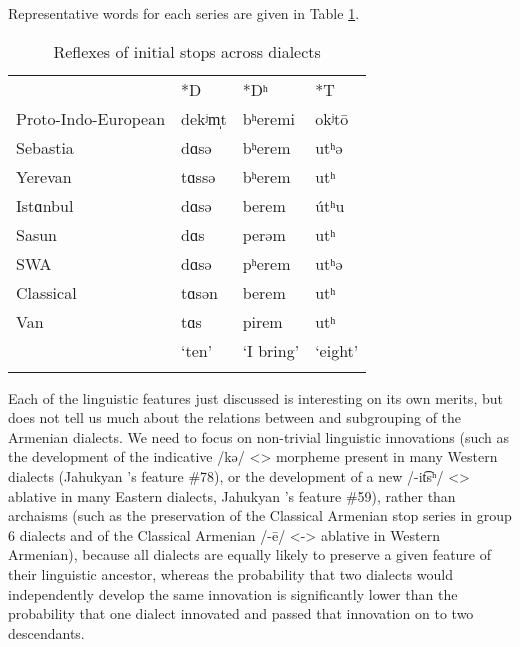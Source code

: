 \documentclass[output=paper]{langscibook}
\begin{document}
Representative words for each series are given in Table \ref{vaux:tab:reflex}.

\begin{table}[h]
\caption{Reflexes of initial stops across dialects}
\label{vaux:tab:reflex}
\centering
\begin{tabularx}{\textwidth}{lXXl}
 \lsptoprule 
 & *D & *Dʰ & *T \\
 \cmidrule(lr){2-4}	
Proto-Indo-European & dekʲm̩t  & bʰeremi  & okʲtō  \\
Sebastia & dɑsə & bʰerem & utʰə \\
Yerevan & tɑssə & bʰerem & utʰ \\
Istɑnbul & dɑsə & berem & útʰu \\
Sasun & dɑs & perəm & utʰ \\
SWA & dɑsə & pʰerem & utʰə \\
Classical & tɑsən & berem & utʰ \\
Van & tɑs & pirem & utʰ\\
\midrule
& `ten' & `I bring' & `eight' \\
\lspbottomrule
\end{tabularx}
\end{table}



\label{sec:vaux:theory:diac:sub:innovationwave}

Each of the linguistic features just discussed is interesting on its own merits, but does not tell us much about the relations between and subgrouping of the Armenian dialects. We need to focus on non-trivial linguistic innovations (such as the development of the indicative /kə/ <>  morpheme present in many Western dialects (Jahukyan \citeyear{Jahukyan-1972-ArmenianDiaolectology}'s feature  \#78), or the development of a new  /-it͡sʰ/ <> ablative in many Eastern dialects, Jahukyan \citeyear{Jahukyan-1972-ArmenianDiaolectology}'s feature \#59), rather than archaisms (such as the preservation of the Classical Armenian stop series in group 6 dialects and of the Classical Armenian /-ē/ <->  ablative in Western Armenian), because all dialects are equally likely to preserve a given feature of their linguistic ancestor, whereas the probability that two dialects would independently develop the same innovation is significantly lower than the probability that one dialect innovated and passed that innovation on to two descendants.
\end{document}
